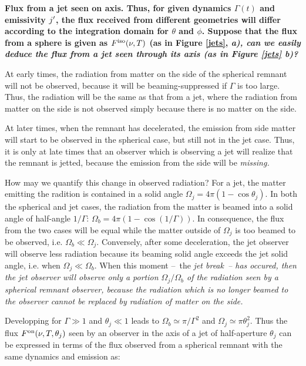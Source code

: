 

\bf{Flux from a jet seen on axis.} Thus, for given dynamics $\Gamma(t)$ and emissivity $j\p$, the flux received from different geometries will differ according to the integration domain for $\theta$ and $\phi$. Suppose that the flux from a sphere is given as $F^\rm{iso}(\nu, T)$ (as in Figure \ref{jets}, \it{a}), can we easily deduce the flux from a jet seen through its axis (as in Figure \ref{jets} \it{b})?

At early times, the radiation from matter on the side of the spherical remnant will not be observed, because it will be beaming-suppressed if $\Gamma$ is too large. Thus, the radiation will be the same as that from a jet, where the radiation from matter on the side is not observed simply because there is no matter on the side.

At later times, when the remnant has decelerated, the emission from side matter will start to be observed in the spherical case, but still not in the jet case. Thus, it is only at late times that an observer which is observing a jet will realize that the remnant is jetted, because the emission from the side will be \it{missing}.

How may we quantify this change in observed radiation? For a jet, the matter emitting the radition is contained in a solid angle $\Omega_j = 4\pi(1 - \cos \theta_j)$. In both the spherical and jet cases, the radiation from the matter is beamed into a solid angle of half-angle $1/\Gamma$: $\Omega_b = 4\pi(1 - \cos(1/\Gamma))$. In consequence, the flux from the two cases will be equal while the matter outside of $\Omega_j$ is too beamed to be observed, i.e. $\Omega_b \ll \Omega_j$. Conversely, after some deceleration, the jet observer will observe less radiation because its beaming solid angle exceeds the jet solid angle, i.e. when $\Omega_j \ll \Omega_b$. When this moment --~the \it{jet break}~-- has occured, then the jet observer will observe only a portion $\Omega_j/\Omega_b$ of the radiation seen by a spherical remnant observer, because the radiation which is no longer beamed to the observer cannot be replaced by radiation of matter on the side.

Developping for $\Gamma \gg 1$ and $\theta_j \ll 1$ leads to $\Omega_b \simeq \pi/\Gamma^2$ and $\Omega_j \simeq \pi\theta_j^2$. Thus the flux $F^{\rm{on}}(\nu, T, \theta_j)$ seen by an observer in the axis of a jet of half-aperture $\theta_j$ can be expressed in terms of the flux observed from a spherical remnant with the same dynamics and emission as:

